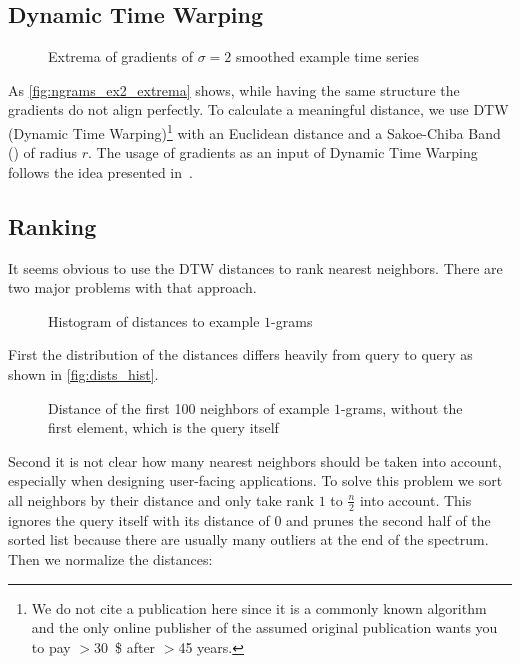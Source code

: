 \subsection{Dynamic Time Warping}
\label{ssec:baseline:sim:dtw}

\begin{figure}
    \centering
    
    \caption{Extrema of gradients of $\sigma = 2$ smoothed example time series}\label{fig:ngrams_ex2_extrema}
\end{figure}

As \autoref{fig:ngrams_ex2_extrema} shows, while having the same structure the gradients do not align perfectly. To calculate a meaningful distance, we use DTW (Dynamic Time Warping)\footnote{We do not cite a publication here since it is a commonly known algorithm and the only online publisher of the assumed original publication wants you to pay $>$\SI{30}{\$} after $>$\num{45} years.} with an Euclidean distance and a Sakoe-Chiba Band (\cite{sakoe}) of radius $r$. The usage of gradients as an input of Dynamic Time Warping follows the idea presented in~\cite{DDTW}.


\subsection{Ranking}
\label{ssec:baseline:sim:rank}

It seems obvious to use the DTW distances to rank nearest neighbors. There are two major problems with that approach.

\begin{figure}
    \centering
    
    \caption{Histogram of distances to example $1$-grams}\label{fig:dists_hist}
\end{figure}

First the distribution of the distances differs heavily from query to query as shown in \autoref{fig:dists_hist}.

\begin{figure}
    \centering
    
    \caption{Distance of the first \num{100} neighbors of example $1$-grams, without the first element, which is the query itself}\label{fig:dists_sorted}
\end{figure}

Second it is not clear how many nearest neighbors should be taken into account, especially when designing user-facing applications. To solve this problem we sort all neighbors by their distance and only take rank $1$ to $\frac{n}{2}$ into account. This ignores the query itself with its distance of \num{0} and prunes the second half of the sorted list because there are usually many outliers at the end of the spectrum. Then we normalize the distances:

